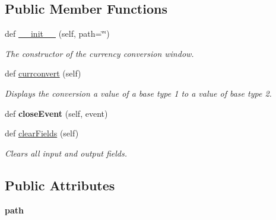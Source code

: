 \subsection*{Public Member Functions}
\begin{DoxyCompactItemize}
\item 
def \hyperlink{class_conversion_currency__ui_1_1_conversion_currency_window_a5219de9caa768775d8a5c638bb20cd17}{\+\_\+\+\_\+init\+\_\+\+\_\+} (self, path=\char`\"{}\char`\"{})
\begin{DoxyCompactList}\small\item\em The constructor of the currency conversion window. \end{DoxyCompactList}\item 
def \hyperlink{class_conversion_currency__ui_1_1_conversion_currency_window_ad8504b8dbbe0d321f4c2374e17c92fcf}{currconvert} (self)
\begin{DoxyCompactList}\small\item\em Displays the conversion a value of a base type 1 to a value of base type 2. \end{DoxyCompactList}\item 
\mbox{\label{class_conversion_currency__ui_1_1_conversion_currency_window_a80345912920b77fcf8d91285cd60a6fd}} 
def {\bfseries close\+Event} (self, event)
\item 
\mbox{\label{class_conversion_currency__ui_1_1_conversion_currency_window_a1f0d0ca2a89ced1a26380744dbdb73dc}} 
def \hyperlink{class_conversion_currency__ui_1_1_conversion_currency_window_a1f0d0ca2a89ced1a26380744dbdb73dc}{clear\+Fields} (self)
\begin{DoxyCompactList}\small\item\em Clears all input and output fields. \end{DoxyCompactList}\end{DoxyCompactItemize}
\subsection*{Public Attributes}
\begin{DoxyCompactItemize}
\item 
\mbox{\label{class_conversion_currency__ui_1_1_conversion_currency_window_af9c27d4f866095863b98223f4687dfae}} 
{\bfseries path}
\end{DoxyCompactItemize}


